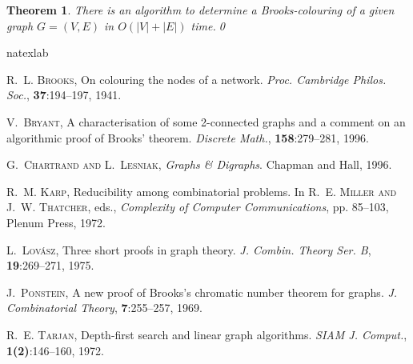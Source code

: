 \documentclass{article}
\newtheorem{theorem}{Theorem}
\begin{document}
\begin{theorem}
There is an algorithm to determine a Brooks-colouring of a given graph $G=(V,E)$ in
$O(|V|+|E|)$ time.\qed
\end{theorem}





\def\soft#1{\leavevmode\setbox0=\hbox{h}\dimen7=\ht0\advance \dimen7
  by-1ex\relax\if t#1\relax\rlap{\raise.6\dimen7
  \hbox{\kern.3ex\char'47}}#1\relax\else\if T#1\relax
  \rlap{\raise.5\dimen7\hbox{\kern1.3ex\char'47}}#1\relax \else\if
  d#1\relax\rlap{\raise.5\dimen7\hbox{\kern.9ex \char'47}}#1\relax\else\if
  D#1\relax\rlap{\raise.5\dimen7 \hbox{\kern1.4ex\char'47}}#1\relax\else\if
  l#1\relax \rlap{\raise.5\dimen7\hbox{\kern.4ex\char'47}}#1\relax \else\if
  L#1\relax\rlap{\raise.5\dimen7\hbox{\kern.7ex
  \char'47}}#1\relax\else\message{accent \string\soft \space #1 not
  defined!}#1\relax\fi\fi\fi\fi\fi\fi} \def\cprime{$'$}
\begin{thebibliography}{7}
\expandafter\ifx\csname natexlab\endcsname\relax\def\natexlab#1{#1}\fi

\textsc{R.~L. Brooks}, On colouring the nodes of a network. \emph{Proc.
  Cambridge Philos. Soc.}, \textbf{37}:194--197, 1941.

\textsc{V.~Bryant}, A characterisation of some 2-connected graphs and a comment
  on an algorithmic proof of {B}rooks' theorem. \emph{Discrete Math.},
  \textbf{158}:279--281, 1996.

\textsc{G.~Chartrand and L.~Lesniak}, \emph{Graphs \& Digraphs}. Chapman and
  Hall, 1996.

\textsc{R.~M. Karp}, Reducibility among combinatorial problems. In
  \textsc{R.~E. Miller and J.~W. Thatcher}, eds., \emph{Complexity of Computer
  Communications}, pp. 85--103, Plenum Press, 1972.

\textsc{L.~Lov\'{a}sz}, Three short proofs in graph theory. \emph{J. Combin.
  Theory Ser. B}, \textbf{19}:269--271, 1975.

\textsc{J.~Ponstein}, A new proof of {B}rooks's chromatic number theorem for
  graphs. \emph{J. Combinatorial Theory}, \textbf{7}:255--257, 1969.

\textsc{R.~E. Tarjan}, Depth-first search and linear graph algorithms.
  \emph{SIAM J. Comput.}, \textbf{1(2)}:146--160, 1972.

\end{thebibliography}
\end{document}
